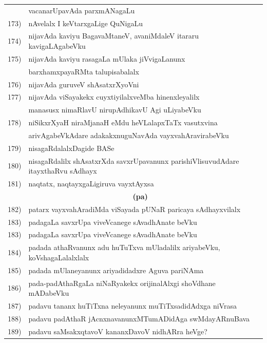 {\begin{longtable}{@{}cp{7.4cm}r}
     & vacanarUpavAda parxmANagaLu & \pageref{page144}\\
173) & nAvelalx I keVtarxgaLige QuNigaLu & \pageref{page104}\\
174) & nijavAda kaviyu BagavaMtaneV, avaniMdaleV itararu kavigaLAgabeVku & \pageref{page239}\\
175) & nijavAda kaviyu rasagaLa mUlaka jiVvigaLanunx  & \pageref{page183}\\
     & barxhamxpayaRMta talupisabalalx & \pageref{page183}\\
176) & nijavAda guruveV shAsatxrXyoVni & \pageref{page68}\\
177) & nijavAda viSayakekx cuyxtiyilalxveMba hinenxleyalilx & \\
     & manasusx nimaRlavU nirupAdhikavU Agi uLiyabeVku & \pageref{page250}\\
178) & niSikxrXyaH niraMjanaH eMdu heVLalapxTaTx vasutxvina & \\
     & arivAgabeVkAdare adakakxnuguNavAda vayxvahAravirabeVku & \pageref{page202}\\
179) & nisagaRdalalxDagide BASe & \pageref{page6}\\
180) & nisagaRdalilx shAsatxrXda savxrUpavanunx parishiVlisuvudAdare itayxthaRvu sAdhayx & \pageref{page249}\\
181) & naqtatx, naqtayxgaLigiruva vayxtAyxsa & \pageref{page242}\\[0.3cm]
     &   \multicolumn{1}{c}{\textbf{(pa)}}  & \\[0.3cm]
182) & patarx vayxvahAradiMda viSayada pUNaR paricaya sAdhayxvilalx & \pageref{page30}\\
183) & padagaLa savxrUpa viveVcanege sAvadhAnate beVku & \pageref{page191}\\
183) & padagaLa savxrUpa viveVcanege sAvadhAnate beVku & \pageref{page191}\\
184) & padada athaRvanunx adu huTuTxva mUladalilx ariyabeVku, koVshagaLalalxlalx & \pageref{page202}\\ 
185) & padada mUlaneyanunx ariyadidadxre Aguva pariNAma & \pageref{page186}\\
186) & pada-padAthaRgaLa niNaRyakekx orijinalAlxgi shoVdhane mADabeVku & \pageref{page215}\\
187) & padavu tananx huTiTxna neleyanunx muTiTxsadidAdxga niVrasa & \pageref{page182}\\ 
188) & padavu padAthaR jAcnxnavanunxMTumADidAga swMdayARnuBava & \pageref{page200}\\
189) & padavu saMsakxqtavoV kananxDavoV nidhARra heVge? &  \pageref{page7}\\

\end{longtable}}
